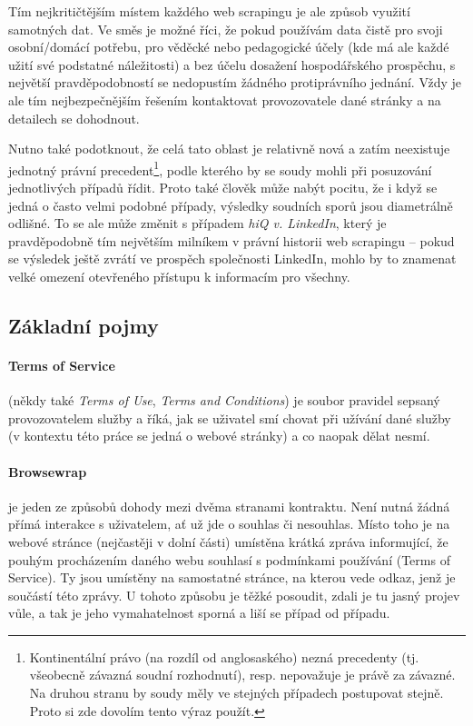 \documentclass[thesis=B,czech]{FITthesis}[2012/06/26]
\begin{document}
Tím nejkritičtějším místem každého web scrapingu je ale způsob využití samotných dat. Ve směs je možné říci, že pokud používám data čistě pro svoji osobní/domácí potřebu, pro věděcké nebo pedagogické účely (kde má ale každé užití své podstatné náležitosti) a bez účelu dosažení hospodářského prospěchu, s největší pravděpodobností se nedopustím žádného protiprávního jednání. Vždy je ale tím nejbezpečnějším řešením kontaktovat provozovatele dané stránky a na detailech se dohodnout.

Nutno také podotknout, že celá tato oblast je relativně nová a zatím neexistuje jednotný právní precedent\footnote{Kontinentální právo (na rozdíl od anglosaského) nezná precedenty (tj. všeobecně závazná soudní rozhodnutí), resp. nepovažuje je právě za závazné. Na druhou stranu by soudy měly ve stejných případech postupovat stejně. Proto si zde dovolím tento výraz použít.}, podle kterého by se soudy mohli při posuzování jednotlivých případů řídit. Proto také člověk může nabýt pocitu, že i když se jedná o často velmi podobné případy, výsledky soudních sporů jsou diametrálně odlišné. To se ale může změnit s případem \emph{hiQ v. LinkedIn}, který je pravděpodobně tím největším milníkem v právní historii web scrapingu -- pokud se výsledek ještě zvrátí ve prospěch společnosti LinkedIn, mohlo by to znamenat velké omezení otevřeného přístupu k informacím pro všechny.

\subsection{Základní pojmy}
\paragraph{Terms of Service} (někdy také \textit{Terms of Use}, \textit{Terms and Conditions}) je soubor pravidel sepsaný provozovatelem služby a říká, jak se uživatel smí chovat při užívání dané služby (v kontextu této práce se jedná o webové stránky) a co naopak dělat nesmí.

\paragraph{Browsewrap} je jeden ze způsobů dohody mezi dvěma stranami kontraktu. Není nutná žádná přímá interakce s uživatelem, ať už jde o souhlas či nesouhlas. Místo toho je na webové stránce (nejčastěji v dolní části) umístěna krátká zpráva informující, že pouhým procházením daného webu souhlasí s podmínkami používání (Terms of Service). Ty jsou umístěny na samostatné stránce, na kterou vede odkaz, jenž je součástí této zprávy. U tohoto způsobu je těžké posoudit, zdali je tu jasný projev vůle, a tak je jeho vymahatelnost sporná a liší se případ od případu.\cite{browse_wrap}
\end{document}
